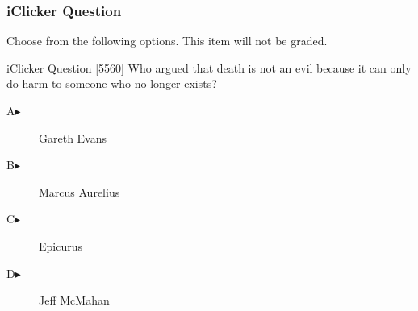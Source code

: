 \begin{frame}
  \frametitle{iClicker Question}
Choose from the following options. This item will not be graded.
\begin{block}{iClicker Question}
[5560] Who argued that death is not an evil because it can only do harm to
someone who no longer exists?
\end{block}
\begin{description}
\item[A\hspace{.2in}$\blacktriangleright$] Gareth Evans
\item[B\hspace{.2in}$\blacktriangleright$] Marcus Aurelius
\item[C\hspace{.2in}$\blacktriangleright$] Epicurus
\item[D\hspace{.2in}$\blacktriangleright$] Jeff McMahan
\end{description}
\end{frame}

